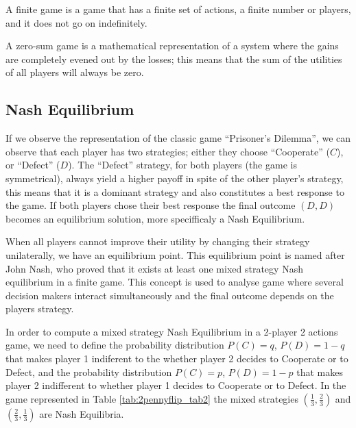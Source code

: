 A finite game is a game that has a finite set of actions, a finite number or players, and it does not go on indefinitely.

A zero-sum game is a mathematical representation of a system where the gains are completely evened out by the losses; this means that the sum of the utilities of all players will always be zero.





\subsection{Nash Equilibrium}
\label{subsec:background:game_theory_nash_equilibrium}

If we observe the representation of the classic game ``Prisoner's Dilemma'', we can observe that each player has two strategies; either they choose ``Cooperate'' ($C$), or ``Defect'' ($D$). The ``Defect'' strategy, for both players (the game is symmetrical), always yield a higher payoff in spite of the other player's strategy, this means that it is a dominant strategy and also constitutes a best response to the game. If both players chose their best response the final outcome $(D,D)$ becomes an equilibrium solution, more specifficaly a Nash Equilibrium. 

When all players cannot improve their utility by changing their strategy unilaterally, we have an equilibrium point. This equilibrium point is named after John Nash, who proved that it exists at least one mixed strategy Nash equilibrium in a finite game\cite{nash50}\cite{Nash51}. This concept is used to analyse game where several decision makers interact simultaneously and the final outcome depends on the players strategy\cite{Osborne2004}.

In order to compute a mixed strategy Nash Equilibrium in a 2-player 2 actions game, we need to define the probability distribution $P(C)=q$, $P(D)=1-q$ that makes player 1 indiferent to the whether player 2 decides to Cooperate or to Defect, and the probability distribution $P(C)=p$, $P(D)=1-p$ that makes player 2 indifferent to whether player 1 decides to Cooperate or to Defect. In the game represented in Table \ref{tab:2pennyflip_tab2} the  mixed strategies $(\frac{1}{3} , \frac{2}{3})$ and $(\frac{2}{3} , \frac{1}{3})$ are Nash Equilibria.

